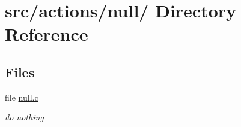 \hypertarget{dir_000036}{
\section{src/actions/null/ Directory Reference}
\label{dir_000036}
}
\subsection*{Files}
\begin{CompactItemize}
\item 
file \hyperlink{null_8c}{null.c}
\begin{CompactList}\small\item\em do nothing \item\end{CompactList}

\end{CompactItemize}

